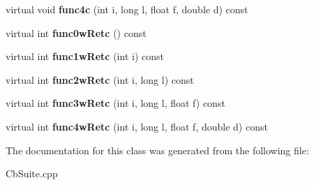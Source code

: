 \begin{DoxyCompactItemize}
\item 
virtual void {\bfseries func4c} (int i, long l, float f, double d) const \label{classY_ad62c469baf4b760a278032ff79509c42}

\item 
virtual int {\bfseries func0w\+Retc} () const \label{classY_ae9b4a0cb1d8f9854cb1369dbe82855f2}

\item 
virtual int {\bfseries func1w\+Retc} (int i) const \label{classY_ac9326addaf1b5828953e60f8b2eaacfb}

\item 
virtual int {\bfseries func2w\+Retc} (int i, long l) const \label{classY_a8eb542f0b5012f44792751ed25088016}

\item 
virtual int {\bfseries func3w\+Retc} (int i, long l, float f) const \label{classY_ade4b7defeb77b95d27c9a5176f35fde1}

\item 
virtual int {\bfseries func4w\+Retc} (int i, long l, float f, double d) const \label{classY_a00990c2d552bb3d357525eeb8cdbafce}

\end{DoxyCompactItemize}


The documentation for this class was generated from the following file\+:\begin{DoxyCompactItemize}
\item 
Cb\+Suite.\+cpp\end{DoxyCompactItemize}
